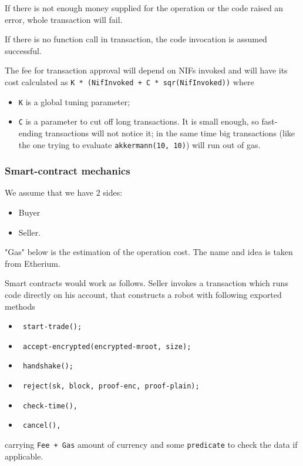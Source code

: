 If there is not enough money supplied for the operation or the code raised an error, whole transaction will fail.

If there is no function call in transaction, the code invocation is assumed successful.

The fee for transaction approval will depend on NIFs invoked and will have its cost calculated as \verb|K * (NifInvoked + C * sqr(NifInvoked))| where
\begin{itemize}
    \item \verb|K| is a global tuning parameter;
    \item \verb|C| is a parameter to cut off long transactions. It is small enough, so fast-ending transactions will not notice it; in the same time big transactions (like the one trying to evaluate \verb|akkermann(10, 10)|) will run out of gas.
\end{itemize}

\subsubsection{Smart-contract mechanics}

We assume that we have 2 sides:
\begin{itemize}
  \item Buyer
  \item Seller.
\end{itemize}

"Gas" below is the estimation of the operation cost. The name and idea is taken from Etherium.

Smart contracts would work as follows. Seller invokes a transaction which runs code directly on his account, that constructs a robot with following exported methods

\begin{itemize}
  \item \begin{verbatim} start-trade(); \end{verbatim}
  \item \begin{verbatim} accept-encrypted(encrypted-mroot, size); \end{verbatim}
  \item \begin{verbatim} handshake(); \end{verbatim}
  \item \begin{verbatim} reject(sk, block, proof-enc, proof-plain); \end{verbatim}
  \item \begin{verbatim} check-time(), \end{verbatim}
  \item \begin{verbatim} cancel(), \end{verbatim}
\end{itemize}
carrying \verb|Fee + Gas| amount of currency and some \verb|predicate| to check the data if applicable.

